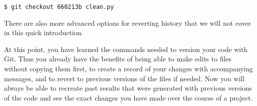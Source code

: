 \begin{lstlisting}
$ git checkout 660213b clean.py
\end{lstlisting}

There are also more advanced options for reverting history that we will not cover in this quick introduction.

At this point, you have learned the commands needed to version your code with Git.
Thus you already have the benefits of being able to make edits to files without copying them first, to create a record of your changes with accompanying messages, and to revert to previous versions of the files if needed.
Now you will always be able to recreate past results that were generated with previous versions of the code and see the exact changes you have made over the course of a project.